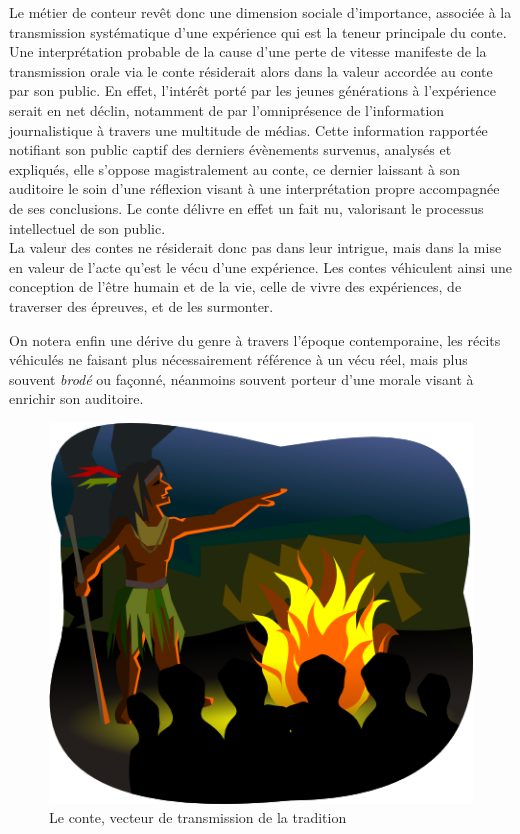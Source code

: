 Le métier de conteur revêt donc une dimension sociale d'importance, associée à la transmission systématique d'une expérience qui est la teneur principale du conte. Une interprétation probable de la cause d'une perte de vitesse manifeste de la transmission orale via le conte résiderait alors dans la valeur accordée au conte par son public. En effet, l'intérêt porté par les jeunes générations à l'expérience serait en net déclin, notamment de par l'omniprésence de l'information journalistique à travers une multitude de médias. Cette information rapportée notifiant son public captif des derniers évènements survenus, analysés et expliqués, elle s'oppose magistralement au conte, ce dernier laissant à son auditoire le soin d'une réflexion visant à une interprétation propre accompagnée de ses conclusions. Le conte délivre en effet un fait nu, valorisant le processus intellectuel de son public.\\

La valeur des contes ne résiderait donc pas dans leur intrigue, mais dans la mise en valeur de l'acte qu'est le vécu d'une expérience. Les contes véhiculent ainsi une conception de l'être humain et de la vie, celle de vivre des expériences, de traverser des épreuves, et de les surmonter.

On notera enfin une dérive du genre à travers l'époque contemporaine, les récits véhiculés ne faisant plus nécessairement référence à un vécu réel, mais plus souvent \textit{brodé} ou façonné, néanmoins souvent porteur d'une morale visant à enrichir son auditoire.\\

\begin{figure}[h!]
    \centering
    \includegraphics[width=0.80\linewidth]{img/storyteller.png}
    \caption{Le conte, vecteur de transmission de la tradition}
\end{figure}

